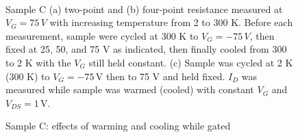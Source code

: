 \noindent 
\begin{figure}
\begin{centering}
~~
\par\end{centering}
\caption{Sample C: effects of warming and cooling while gated\label{fig:Sample-C-effects-of-warming-cooling}}

Sample C (a) two-point and (b) four-point resistance measured at $V_{G}=75\,V$
with increasing temperature from 2 to 300 K. Before each measurement,
sample were cycled at 300 K to $V_{G}=-75\,V$, then fixed at 25,
50, and 75 V as indicated, then finally cooled from 300 to 2 K with
the $V_{G}$ still held constant. (c) Sample was cycled at 2 K (300
K) to $V_{G}=-75\,\mathrm{V}$ then to 75 V and held fixed. $I_{D}$
was measured while sample was warmed (cooled) with constant $V_{G}$
and $V_{DS}=1\,\mathrm{V}$.
\end{figure}

